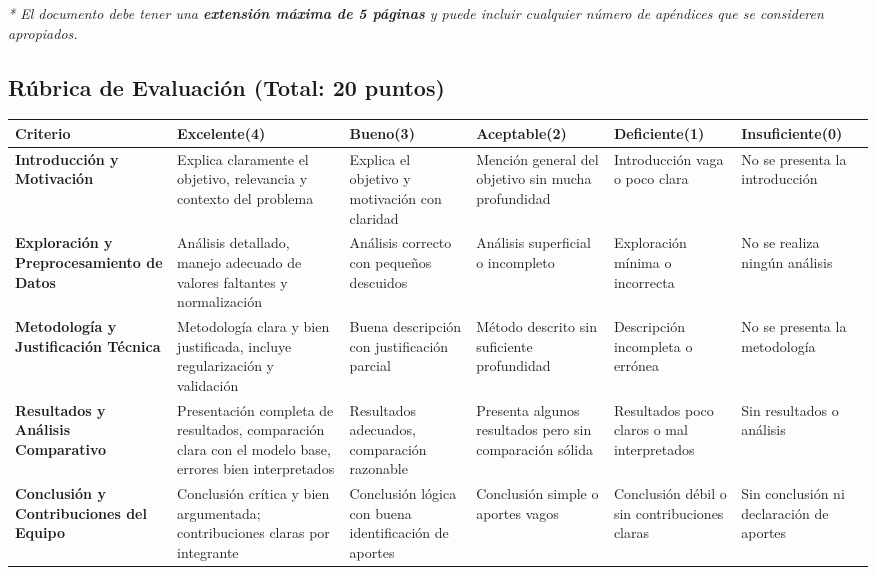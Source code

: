 \textit{* El documento debe tener una \textbf{extensión máxima de 5 páginas} y puede incluir cualquier número de apéndices que se consideren apropiados.} \\
  


\newpage
\subsection{Rúbrica de Evaluación (Total: 20 puntos)}


\begin{table}[!hp]
\begin{tabular}{|>{\raggedright\arraybackslash}p{3cm}|>{\centering\arraybackslash}p{2.5cm}|>{\centering\arraybackslash}p{2.5cm}|>{\centering\arraybackslash}p{2.5cm}|>{\centering\arraybackslash}p{2.5cm}|>{\centering\arraybackslash}p{2.5cm}|}
\hline
\textbf{Criterio} & \textbf{Excelente(4)} & \textbf{Bueno(3)} & \textbf{Aceptable(2)} & \textbf{Deficiente(1)} & \textbf{Insuficiente(0)} \\
\hline
\textbf{Introducción y Motivación} & Explica claramente el objetivo, relevancia y contexto del problema & Explica el objetivo y motivación con claridad & Mención general del objetivo sin mucha profundidad & Introducción vaga o poco clara & No se presenta la introducción \\
\hline
\textbf{Exploración y Preprocesamiento de Datos} & Análisis detallado, manejo adecuado de valores faltantes y normalización & Análisis correcto con pequeños descuidos & Análisis superficial o incompleto & Exploración mínima o incorrecta & No se realiza ningún análisis \\
\hline
\textbf{Metodología y Justificación Técnica} & Metodología clara y bien justificada, incluye regularización y validación & Buena descripción con justificación parcial & Método descrito sin suficiente profundidad & Descripción incompleta o errónea & No se presenta la metodología \\
\hline
\textbf{Resultados y Análisis Comparativo} & Presentación completa de resultados, comparación clara con el modelo base, errores bien interpretados & Resultados adecuados, comparación razonable & Presenta algunos resultados pero sin comparación sólida & Resultados poco claros o mal interpretados & Sin resultados o análisis \\
\hline
\textbf{Conclusión y Contribuciones del Equipo} & Conclusión crítica y bien argumentada; contribuciones claras por integrante & Conclusión lógica con buena identificación de aportes & Conclusión simple o aportes vagos & Conclusión débil o sin contribuciones claras & Sin conclusión ni declaración de aportes \\
\hline
\end{tabular}
\end{table}
